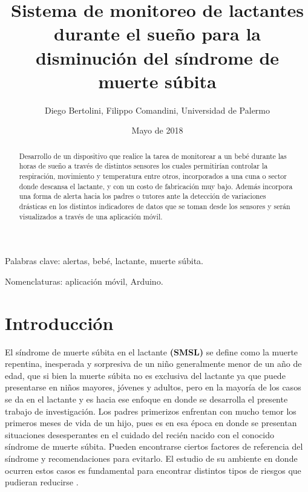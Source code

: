 \documentclass{IEEEtran}
\begin{document}
	\title{Sistema de monitoreo de lactantes durante el sueño para la disminución del síndrome de muerte súbita}
	\author{Diego Bertolini, Filippo Comandini, Universidad de Palermo}
	\date{Mayo de 2018}	
	\maketitle
	
	\begin{abstract}
		Desarrollo de un dispositivo que realice la tarea de monitorear a un bebé durante las horas de sueño a través de distintos sensores los cuales permitirían controlar la respiración, movimiento y temperatura entre otros, incorporados a una cuna o sector donde descansa el lactante, y con un costo de fabricación muy bajo. Además incorpora una forma de alerta hacia los padres o tutores ante la detección de variaciones drásticas en los distintos indicadores de datos que se toman desde los sensores y serán visualizados a través de una aplicación móvil.
	\end{abstract}
	
	Palabras clave: alertas, bebé, lactante, muerte súbita.
	
	Nomenclaturas: aplicación móvil, Arduino.
	
	\section{Introducción}
	
	
		El síndrome de muerte súbita en el lactante \textbf{(SMSL)} \cite{garcia2008sindrome} se define como la muerte repentina, inesperada y sorpresiva de un niño generalmente menor de un año de edad, que si bien la muerte súbita no es exclusiva del lactante ya que puede presentarse en niños mayores, jóvenes y adultos, pero en la mayoría de los casos se da en el lactante y es hacia ese enfoque en donde se desarrolla el presente trabajo de investigación. Los padres primerizos enfrentan con mucho temor los primeros meses de vida de un hijo, pues es en esa época en donde se presentan situaciones desesperantes en el cuidado del recién nacido con el conocido síndrome de muerte súbita. Pueden encontrarse ciertos factores de referencia del síndrome y recomendaciones \cite{subita2000nuevas} para evitarlo. El estudio de su ambiente en donde ocurren estos casos es fundamental para encontrar distintos tipos de riesgos que pudieran reducirse \cite{aguilera2002importancia}.
		
\end{document}
